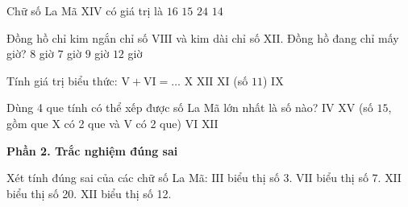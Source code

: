 \begin{ex} %
Chữ số La Mã $\text{XIV}$ có giá trị là
\choice
{$16$}
{$15$}
{$24$}
{\True $14$}
\end{ex}

\begin{ex} %
Đồng hồ chỉ kim ngắn chỉ số $\text{VIII}$ và kim dài chỉ số $\text{XII}$. Đồng hồ đang chỉ mấy giờ?
\choice
{\True $8$ giờ}
{$7$ giờ}
{$9$ giờ}
{$12$ giờ}
\end{ex}

\begin{ex} %
Tính giá trị biểu thức: $\text{V} + \text{VI} = \dots$
\choice
{$\text{X}$}
{$\text{XII}$}
{\True $\text{XI}$ (số $11$)}
{$\text{IX}$}
\end{ex}

\begin{ex} %
Dùng 4 que tính có thể xếp được số La Mã lớn nhất là số nào?
\choice
{$\text{IV}$}
{\True $\text{XV}$ (số $15$, gồm que $\text{X}$ có 2 que và $\text{V}$ có 2 que)}
{$\text{VI}$}
{$\text{XII}$}
\end{ex}

\textbf{Phần 2. Trắc nghiệm đúng sai}

\begin{ex} %
Xét tính đúng sai của các chữ số La Mã:
\choiceTF
{\True $\text{III}$ biểu thị số 3.}
{\True $\text{VII}$ biểu thị số 7.}
{$\text{XII}$ biểu thị số 20.}
{\True $\text{XII}$ biểu thị số 12.}
\end{ex}

